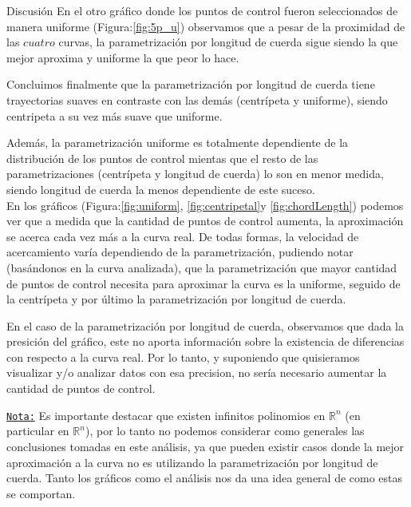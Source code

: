 \begin{section}{Discusión}
	En el otro gráfico donde los puntos de control fueron seleccionados de manera uniforme (Figura:\ref{fig:5p_u}) observamos que a pesar de la proximidad de las $cuatro$ curvas, la parametrización por longitud de cuerda sigue siendo la que mejor aproxima y uniforme la que peor lo hace.
	
	Concluimos finalmente que la parametrización por longitud de cuerda tiene trayectorias suaves en contraste con las demás (centrípeta y uniforme), siendo centripeta a su vez más suave que uniforme. 
	
	Además, la parametrización uniforme es totalmente dependiente de la distribución de los puntos de control mientas que el resto de las parametrizaciones (centrípeta y longitud de cuerda) lo son en menor medida, siendo longitud de cuerda la menos dependiente de este suceso.\\
	
	En los gráficos (Figura:\ref{fig:uniform}, \ref{fig:centripetal}y \ref{fig:chordLength}) podemos ver que a medida que la cantidad de puntos de control aumenta, la aproximación se acerca cada vez más a la curva real. De todas formas, la velocidad de acercamiento varía dependiendo de la parametrización, pudiendo notar (basándonos en la curva analizada), que la parametrización que mayor cantidad de puntos de control necesita para aproximar la curva es la uniforme, seguido de la centrípeta y por último la parametrización por longitud de cuerda.
	
	En el caso de la parametrización por longitud de cuerda, observamos que dada la presición del gráfico, este no aporta información sobre la existencia de diferencias con respecto a la curva real. Por lo tanto, y suponiendo que quisieramos visualizar y/o analizar datos con esa precision, no sería necesario aumentar la cantidad de puntos de control.
	
	\underline{\texttt{Nota:}} Es importante destacar que existen infinitos polinomios en $\mathbb{R}^n$ (en particular en $\mathbb{R}^n$), por lo tanto no podemos considerar como generales las conclusiones tomadas en este análisis, ya que pueden existir casos donde la mejor aproximación a la curva no es utilizando la parametrización por longitud de cuerda. Tanto los gráficos como el análisis nos da una idea general de como estas se comportan.
	


	
\end{section}
